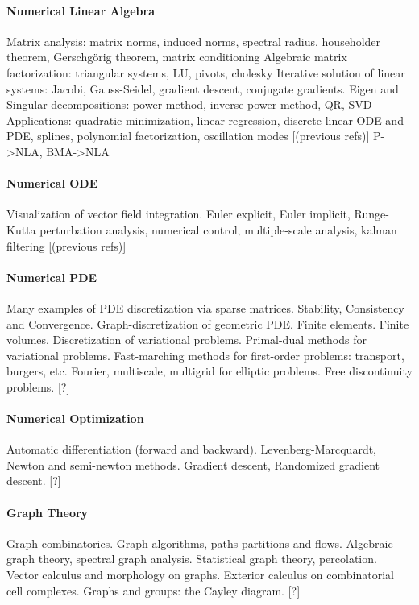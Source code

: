 \paragraph{Numerical Linear Algebra}
Matrix analysis: matrix norms, induced norms, spectral radius, householder
theorem, Gerschgörig theorem, matrix conditioning
Algebraic matrix factorization: triangular systems, LU, pivots, cholesky
Iterative solution of linear systems: Jacobi, Gauss-Seidel, gradient descent,
conjugate gradients.
Eigen and Singular decompositions: power method, inverse power method, QR,
SVD
Applications: quadratic minimization, linear regression, discrete linear ODE
and PDE, splines, polynomial factorization, oscillation modes
[(previous refs)]
{P->NLA, BMA->NLA}

\paragraph{Numerical ODE}
Visualization of vector field integration.
Euler explicit, Euler implicit, Runge-Kutta
perturbation analysis, numerical control,
multiple-scale analysis, kalman filtering
[(previous refs)]

\paragraph{Numerical PDE}
Many examples of PDE discretization via sparse matrices.
Stability, Consistency and Convergence.
Graph-discretization of geometric PDE.
Finite elements.
Finite volumes.
Discretization of variational problems.
Primal-dual methods for variational problems.
Fast-marching methods for first-order problems: transport, burgers, etc.
Fourier, multiscale, multigrid for elliptic problems.
Free discontinuity problems.
[?]

\paragraph{Numerical Optimization}
Automatic differentiation (forward and backward).
Levenberg-Marcquardt, Newton and semi-newton methods.
Gradient descent, Randomized gradient descent.
[?]

\paragraph{Graph Theory}
Graph combinatorics.
Graph algorithms, paths partitions and flows.
Algebraic graph theory, spectral graph analysis.
Statistical graph theory, percolation.
Vector calculus and morphology on graphs.
Exterior calculus on combinatorial cell complexes.
Graphs and groups: the Cayley diagram.
[?]

